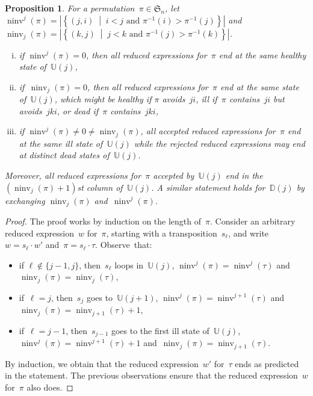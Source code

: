 \documentclass{amsart}
\newtheorem{proposition}[theorem]{Proposition}
\newcommand{\fS}{\mathfrak{S}} %
\newcommand{\set}[2]{\left\{ #1 \;\middle|\; #2 \right\}} %
\DeclareMathOperator{\ninv}{ninv} %
\newcommand{\automatonU}{\mathbb{U}} %
\newcommand{\automatonD}{\mathbb{D}} %
\begin{document}
\begin{proposition}\label{prop:sameStateAcceptedReducedExpressionsRefined}
For a permutation~$\pi \in \fS_n$, let~$\ninv^j(\pi) = |\set{(j,i)}{i < j \text{ and } \pi^{-1}(i) > \pi^{-1}(j)}|$ and~$\ninv_j(\pi) = |\set{(k,j)}{j < k \text{ and } \pi^{-1}(j) > \pi^{-1}(k)}|$.
\begin{enumerate}[(i)]
	\item if $\ninv^j(\pi) = 0$, then all reduced expressions for~$\pi$ end at the same healthy state of~$\automatonU(j)$,
	\item if~$\ninv_j(\pi) = 0$, then all reduced expressions for~$\pi$ end at the same state of~$\automatonU(j)$, which might be healthy if $\pi$ avoids~$ji$, ill if~$\pi$ contains~$ji$ but avoids~$jki$, or dead if~$\pi$ contains~$jki$,
	\item if $\ninv^j(\pi) \ne 0 \ne \ninv_j(\pi)$, all accepted reduced expressions for~$\pi$ end at the same ill state of~$\automatonU(j)$ while the rejected reduced expressions may end at distinct dead states of~$\automatonU(j)$.
\end{enumerate}
Moreover, all reduced expressions for~$\pi$ accepted by~$\automatonU(j)$ end in the $(\ninv_j(\pi)+1)$st column of~$\automatonU(j)$.
A similar statement holds for~$\automatonD(j)$ by exchanging $\ninv_j(\pi)$ and~$\ninv^j(\pi)$.
\end{proposition}

\begin{proof}
The proof works by induction on the length of~$\pi$.
Consider an arbitrary reduced expression~$w$ for~$\pi$, starting with a transposition~$s_\ell$, and write~$w = s_\ell \cdot w'$ and~$\pi = s_\ell \cdot \tau$.
Observe~that:
\begin{itemize}
	\item if $\ell \notin \{j-1, j\}$, then~$s_\ell$ loops in~$\automatonU(j)$, $\ninv^j(\pi) = \ninv^j(\tau)$ and $\ninv_j(\pi) = \ninv_j(\tau)$,
	\item if~$\ell = j$, then~$s_j$ goes to~$\automatonU(j+1)$, $\ninv^j(\pi) = \ninv^{j+1}(\tau)$ and~${\ninv_j(\pi) = \ninv_{j+1}(\tau) + 1}$,
	\item if~$\ell = j-1$, then~$s_{j-1}$ goes to the first ill state of~$\automatonU(j)$, $\ninv^j(\pi) = \ninv^{j+1}(\tau) + 1$ and~$\ninv_j(\pi) = \ninv_{j+1}(\tau)$.
\end{itemize}
By induction, we obtain that the reduced expression~$w'$ for~$\tau$ ends as predicted in the statement.
The previous observations ensure that the reduced expression~$w$ for~$\pi$ also does.
\end{proof}
\end{document}
